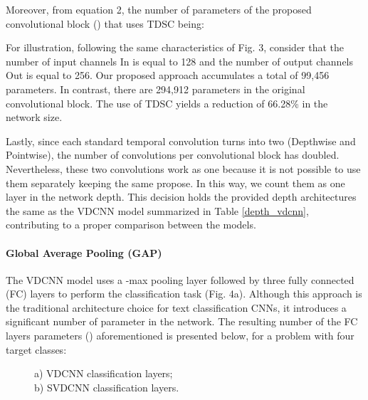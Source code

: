 \documentclass[conference]{IEEEtran}
\begin{document}
Moreover, from equation 2, the number of parameters of the proposed convolutional block () that uses TDSC being:



For illustration, following the same characteristics of Fig. 3, consider that the number of input channels In is equal to 128 and the number of output channels Out is equal to 256. Our proposed approach accumulates a total of 99,456 parameters. In contrast, there are 294,912 parameters in the original convolutional block. The use of TDSC yields a reduction of 66.28\% in the network size.

Lastly, since each standard temporal convolution turns into two  (Depthwise and Pointwise), the number of convolutions per convolutional block has doubled. Nevertheless, these two convolutions work as one because it is not possible to use them separately keeping the same propose. In this way, we count them as one layer in the network depth. This decision holds the provided depth architectures the same as the VDCNN model summarized in Table \ref{depth_vdcnn}, contributing to a proper comparison between the models. 

\paragraph{Global Average Pooling (GAP)}
The VDCNN model uses a -max pooling layer  followed by three fully connected (FC) layers to perform the classification task (Fig. 4a). Although this approach is the traditional architecture choice for text classification CNNs, it introduces a significant number of parameter in the network. The resulting number of the FC layers parameters () aforementioned is presented below, for a problem with four target classes:



\begin{figure}[htbp]
\begin{minipage}{.5\linewidth}
\centering
{}
\end{minipage}\begin{minipage}{.5\linewidth}
\end{minipage}
\caption{a) VDCNN classification layers;\\b) SVDCNN classification layers.}
\label{fig:main}
\end{figure}

\newpage
\end{document}

